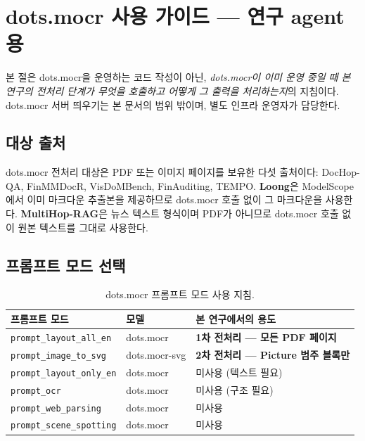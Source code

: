 \documentclass[11pt]{article}
\begin{document}
\section{dots.mocr 사용 가이드 — 연구 agent용}
\label{sec:dotsmocr}

본 절은 dots.mocr을 운영하는 코드 작성이 아닌, \emph{dots.mocr이 이미 운영 중일 때 본 연구의 전처리 단계가 무엇을 호출하고 어떻게 그 출력을 처리하는지}의 지침이다. dots.mocr 서버 띄우기는 본 문서의 범위 밖이며, 별도 인프라 운영자가 담당한다.

\subsection{대상 출처}

dots.mocr 전처리 대상은 PDF 또는 이미지 페이지를 보유한 다섯 출처이다: DocHop-QA, FinMMDocR, VisDoMBench, FinAuditing, TEMPO. \textbf{Loong}은 ModelScope에서 이미 마크다운 추출본을 제공하므로 dots.mocr 호출 없이 그 마크다운을 사용한다. \textbf{MultiHop-RAG}은 뉴스 텍스트 형식이며 PDF가 아니므로 dots.mocr 호출 없이 원본 텍스트를 그대로 사용한다.

\subsection{프롬프트 모드 선택}

\begin{table}[h]
\centering
\small
\begin{tabular}{lll}
\toprule
프롬프트 모드 & 모델 & 본 연구에서의 용도 \\
\midrule
\texttt{prompt\_layout\_all\_en} & dots.mocr & \textbf{1차 전처리 — 모든 PDF 페이지} \\
\texttt{prompt\_image\_to\_svg} & dots.mocr-svg & \textbf{2차 전처리 — Picture 범주 블록만} \\
\texttt{prompt\_layout\_only\_en} & dots.mocr & 미사용 (텍스트 필요) \\
\texttt{prompt\_ocr} & dots.mocr & 미사용 (구조 필요) \\
\texttt{prompt\_web\_parsing} & dots.mocr & 미사용 \\
\texttt{prompt\_scene\_spotting} & dots.mocr & 미사용 \\
\bottomrule
\end{tabular}
\caption{dots.mocr 프롬프트 모드 사용 지침.}
\end{table}
\end{document}
